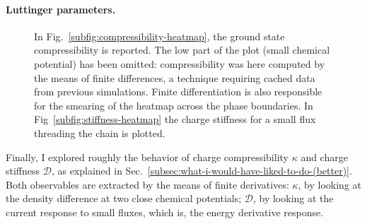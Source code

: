 \paragraph{Luttinger parameters.} 

\begin{figure}
	\centering	
	\caption{In Fig.~\ref{subfig:compressibility-heatmap}, the ground state compressibility is reported. The low part of the plot (small chemical potential) has been omitted: compressibility was here computed by the means of finite differences, a technique requiring cached data from previous simulations. Finite differentiation is also responsible for the smearing of the heatmap across the phase boundaries. In Fig~\ref{subfig:stiffness-heatmap} the charge stiffness for a small flux threading the chain is plotted.}
\end{figure}

Finally, I explored roughly the behavior of charge compressibility $\kappa$ and charge stiffness $\mathcal{D}$, as explained in Sec.~\ref{subsec:what-i-would-have-liked-to-do-(better)}. Both observables are extracted by the means of finite derivatives: $\kappa$, by looking at the density difference at two close chemical potentials; $\mathcal{D}$, by looking at the current response to small fluxes, which is, the energy derivative response.

